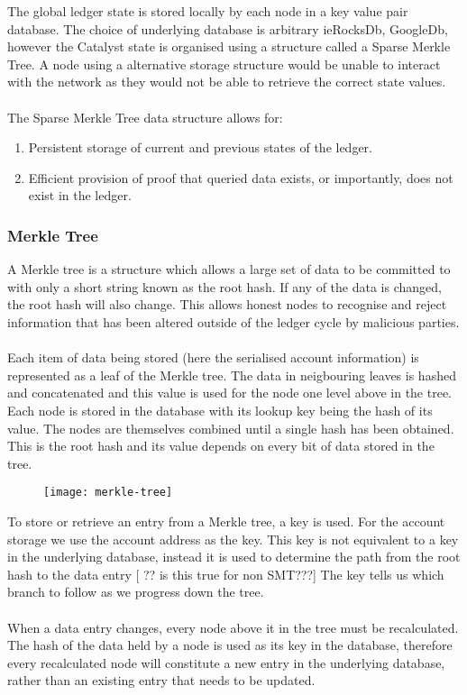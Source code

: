 
The global ledger state is stored locally by each node in a key value pair database. The choice of underlying database is arbitrary ieRocksDb, GoogleDb, however the Catalyst state  is organised using a structure called a Sparse Merkle Tree. A node using a alternative storage structure would be unable to interact with the network as they would not be able to retrieve the correct state values.
\\
\\
The Sparse Merkle Tree data structure allows for:

\begin{enumerate}
\item Persistent storage of current and previous states of the ledger.
\item Efficient provision of proof that queried data exists, or importantly, does not exist in the ledger.\end{enumerate}

\subsubsection{Merkle Tree}

A Merkle tree is a structure which allows a large set of data to be committed to with only a short string known as the root hash.  If any of the data is changed, the root hash will also change. This allows honest nodes to recognise and reject information that has been altered outside of the ledger cycle by malicious parties. 
\\
\\
Each item of data being stored (here the serialised account information) is represented as a leaf of the Merkle tree. The data in neigbouring leaves is hashed and concatenated and this value is used for the node one level above in the tree. Each node is stored in the database with its lookup key being the hash of its value. The nodes are themselves combined until a single hash has been obtained. This is the root hash and its value depends on every bit of data stored in the tree.

\begin{figure}[h]
  \centering
\texttt{[image: merkle-tree]}
\end{figure}

To store or retrieve an entry from a Merkle tree, a key is used. For the account storage we use the account address as the key. This key is not equivalent to a key in the underlying database, instead it is used to determine the path from the root hash to the data entry [ ?? is this true for non SMT???] The key tells us which branch to follow as we progress down the tree. 
\\
\\
When a data entry changes, every node above it in the tree must be recalculated. The hash of the data held by a node is used as its key in the database, therefore every recalculated node will constitute a new entry in the underlying database, rather than an existing entry that needs to be updated.

